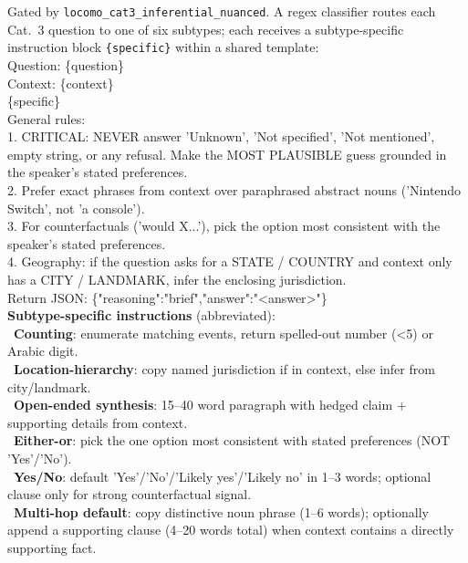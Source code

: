 \begin{tcolorbox}[title={\textbf{LoCoMo Cat.~3 Nuanced-Inferential (discovered, 6 subtypes): User Prompt}}, breakable, colback=orange!3, colframe=orange!40]
\small\ttfamily
Gated by \texttt{locomo\_cat3\_inferential\_nuanced}. A regex classifier routes each Cat.~3 question to one of six subtypes; each receives a subtype-specific instruction block \texttt{\{specific\}} within a shared template:\\[0.3em]
Question: \{question\}\\
Context: \{context\}\\[0.3em]
\{specific\}\\[0.3em]
General rules:\\
1. CRITICAL: NEVER answer 'Unknown', 'Not specified', 'Not mentioned', empty string, or any refusal. Make the MOST PLAUSIBLE guess grounded in the speaker's stated preferences.\\
2. Prefer exact phrases from context over paraphrased abstract nouns ('Nintendo Switch', not 'a console').\\
3. For counterfactuals ('would X...'), pick the option most consistent with the speaker's stated preferences.\\
4. Geography: if the question asks for a STATE / COUNTRY and context only has a CITY / LANDMARK, infer the enclosing jurisdiction.\\
Return JSON: \{"reasoning":"brief","answer":"<answer>"\}\\[0.5em]
\normalfont\textbf{Subtype-specific instructions} (abbreviated):\\[0.3em]
\textbullet\ \textbf{Counting}: enumerate matching events, return spelled-out number (<5) or Arabic digit.\\
\textbullet\ \textbf{Location-hierarchy}: copy named jurisdiction if in context, else infer from city/landmark.\\
\textbullet\ \textbf{Open-ended synthesis}: 15--40 word paragraph with hedged claim + supporting details from context.\\
\textbullet\ \textbf{Either-or}: pick the one option most consistent with stated preferences (NOT 'Yes'/'No').\\
\textbullet\ \textbf{Yes/No}: default 'Yes'/'No'/'Likely yes'/'Likely no' in 1--3 words; optional clause only for strong counterfactual signal.\\
\textbullet\ \textbf{Multi-hop default}: copy distinctive noun phrase (1--6 words); optionally append a supporting clause (4--20 words total) when context contains a directly supporting fact.
\end{tcolorbox}

